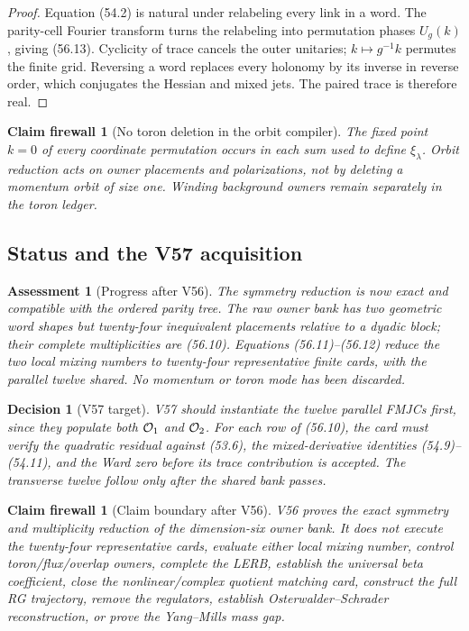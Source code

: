 \documentclass[11pt,oneside]{book}
\newtheorem{assessment}[theorem]{Assessment}
\newtheorem{firewall}[theorem]{Claim firewall}
\newtheorem{decision}[theorem]{Decision}
\theoremstyle{definition}
\theoremstyle{remark}
\begin{document}
\begin{proof}
Equation (54.2) is natural under relabeling every link in a word.
The parity-cell Fourier transform turns the relabeling into
permutation phases \(U_g(k)\), giving (56.13).  Cyclicity of trace
cancels the outer unitaries; \(k\mapsto g^{-1}k\) permutes the
finite grid.  Reversing a word replaces every holonomy by its
inverse in reverse order, which conjugates the Hessian and mixed
jets.  The paired trace is therefore real.
\end{proof}

\begin{firewall}[No toron deletion in the orbit compiler]
\label{fire:e8v56-toron}
The fixed point \(k=0\) of every coordinate permutation occurs in
each sum used to define \(\xi_\lambda\).  Orbit reduction acts on
owner placements and polarizations, not by deleting a momentum
orbit of size one.  Winding background owners remain separately in
the toron ledger.
\end{firewall}

\subsection{Status and the V57 acquisition}

\begin{assessment}[Progress after V56]
\label{ass:e8v56-status}
The symmetry reduction is now exact and compatible with the
ordered parity tree.  The raw owner bank has two geometric word
shapes but twenty-four inequivalent placements relative to a
dyadic block; their complete multiplicities are (56.10).
Equations (56.11)--(56.12) reduce the two local mixing numbers to
twenty-four representative finite cards, with the parallel twelve
shared.  No momentum or toron mode has been discarded.
\end{assessment}

\begin{decision}[V57 target]
\label{dec:e8v56-next}
V57 should instantiate the twelve parallel FMJCs first, since they
populate both \({\cal O}_1\) and \({\cal O}_2\).  For each row of
(56.10), the card must verify the quadratic residual against
(53.6), the mixed-derivative identities (54.9)--(54.11), and the
Ward zero before its trace contribution is accepted.  The
transverse twelve follow only after the shared bank passes.
\end{decision}

\begin{firewall}[Claim boundary after V56]
\label{fire:e8v56-claim}
V56 proves the exact symmetry and multiplicity reduction of the
dimension-six owner bank.  It does not execute the twenty-four
representative cards, evaluate either local mixing number, control
toron/flux/overlap owners, complete the LERB, establish the
universal beta coefficient, close the nonlinear/complex quotient
matching card, construct the full RG trajectory, remove the
regulators, establish Osterwalder--Schrader reconstruction, or
prove the Yang--Mills mass gap.
\end{firewall}
\end{document}
